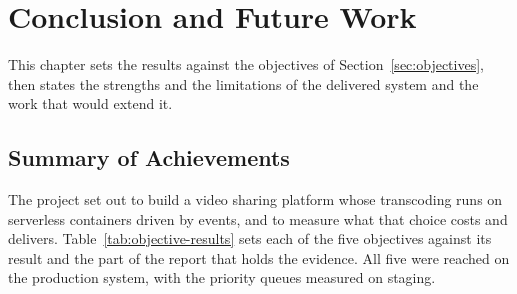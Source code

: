 \chapter{Conclusion and Future Work}
\label{chap:conclusion}

This chapter sets the results against the objectives of Section~\ref{sec:objectives}, then states
the strengths and the limitations of the delivered system and the work that would extend it.

\section{Summary of Achievements}
\label{sec:summary}

The project set out to build a video sharing platform whose transcoding runs on serverless
containers driven by events, and to measure what that choice costs and delivers.
Table~\ref{tab:objective-results} sets each of the five objectives against its result and the part
of the report that holds the evidence. All five were reached on the production system, with the
priority queues measured on staging.


